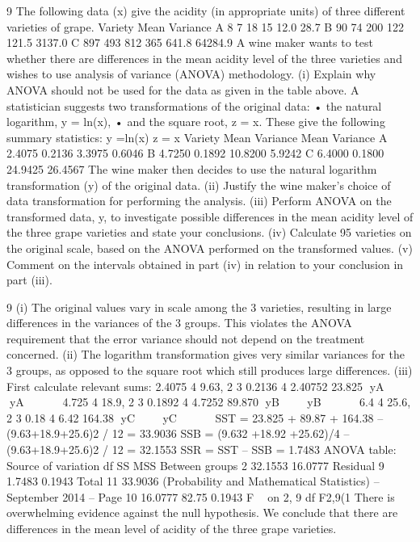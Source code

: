 \documentclass[a4paper,12pt]{article}
\begin{document}
\begin{enumerate}
9 The following data (x) give the acidity (in appropriate units) of three different
varieties of grape.
Variety Mean Variance
A 8 7 18 15 12.0 28.7
B 90 74 200 122 121.5 3137.0
C 897 493 812 365 641.8 64284.9
A wine maker wants to test whether there are differences in the mean acidity level of
the three varieties and wishes to use analysis of variance (ANOVA) methodology.
(i) Explain why ANOVA should not be used for the data as given in the table
above. 
A statistician suggests two transformations of the original data:
  • the natural logarithm, y = ln(x),
• and the square root, z = x.
These give the following summary statistics:
  y =ln(x) z = x
Variety Mean Variance Mean Variance
A 2.4075 0.2136 3.3975 0.6046
B 4.7250 0.1892 10.8200 5.9242
C 6.4000 0.1800 24.9425 26.4567
The wine maker then decides to use the natural logarithm transformation (y) of the
original data.
(ii) Justify the wine maker’s choice of data transformation for performing the
analysis. 
(iii) Perform ANOVA on the transformed data, y, to investigate possible
differences in the mean acidity level of the three grape varieties and state your
conclusions. 
(iv) Calculate 95%
varieties on the original scale, based on the ANOVA performed on the
transformed values. 
(v) Comment on the intervals obtained in part (iv) in relation to your conclusion
in part (iii). 

\newpage

9 (i) The original values vary in scale among the 3 varieties, resulting in large
differences in the variances of the 3 groups. This violates the ANOVA
requirement that the error variance should not depend on the treatment
concerned. 
(ii) The logarithm transformation gives very similar variances for the 3 groups, as
opposed to the square root which still produces large differences. 
(iii) First calculate relevant sums:
  2.4075 4 9.63, 2 3 0.2136 4 2.40752 23.825 yA    yA     
4.725 4 18.9, 2 3 0.1892 4 4.7252 89.870 yB    yB     
6.4 4 25.6, 2 3 0.18 4 6.42 164.38 yC    yC     
SST = 23.825 + 89.87 + 164.38 – (9.63+18.9+25.6)2 / 12 = 33.9036
SSB = (9.632 +18.92 +25.62)/4 – (9.63+18.9+25.6)2 / 12 = 32.1553
SSR = SST – SSB = 1.7483
ANOVA table:
  Source of variation df SS MSS
Between groups 2 32.1553 16.0777
Residual 9 1.7483 0.1943
Total 11 33.9036
 (Probability and Mathematical Statistics) – September 2014 – 
Page 10
16.0777 82.75
0.1943
F  on 2, 9 df
F2,9(1%
There is overwhelming evidence against the null hypothesis. We conclude that
there are differences in the mean level of acidity of the three grape varieties.


\end{enumerate}
\end{document}
